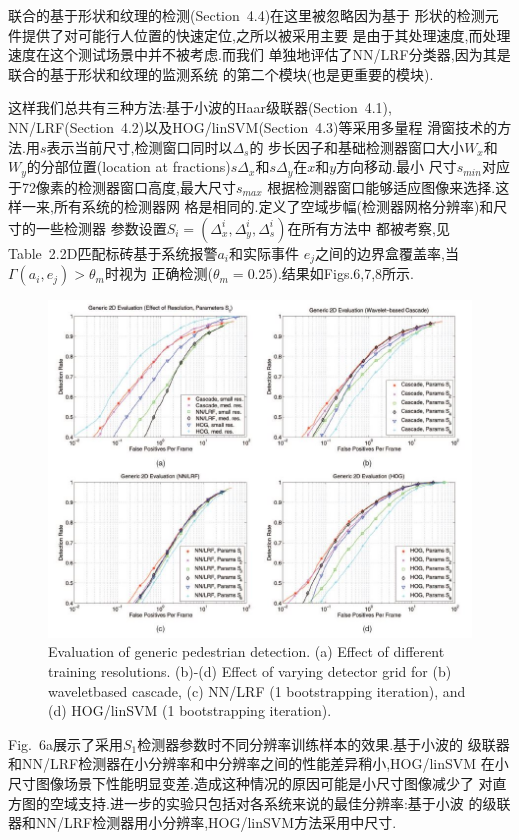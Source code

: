 \documentclass[10pt,letterpaper,journal,compsoc]{IEEEtran}
\begin{document}
联合的基于形状和纹理的检测(Section~4.4)在这里被忽略因为基于
形状的检测元件提供了对可能行人位置的快速定位,之所以被采用主要
是由于其处理速度,而处理速度在这个测试场景中并不被考虑.而我们
单独地评估了NN/LRF分类器,因为其是联合的基于形状和纹理的监测系统
的第二个模块(也是更重要的模块).

这样我们总共有三种方法:基于小波的Haar级联器(Section~4.1),
NN/LRF(Section~4.2)以及HOG/linSVM(Section~4.3)等采用多量程
滑窗技术的方法.用$s$表示当前尺寸,检测窗口同时以$\Delta_s$的
步长因子和基础检测器窗口大小$W_x$和$W_y$的分部位置(location at
fractions)$s\Delta_x$和$s\Delta_y$在$x$和$y$方向移动.最小
尺寸$s_{min}$对应于72像素的检测器窗口高度,最大尺寸$s_{max}$
根据检测器窗口能够适应图像来选择.这样一来,所有系统的检测器网
格是相同的.定义了空域步幅(检测器网格分辨率)和尺寸的一些检测器
参数设置$S_i=(\Delta^i_x,\Delta^i_y,\Delta^i_s)$在所有方法中
都被考察,见Table~2.2D匹配标砖基于系统报警$a_i$和实际事件
$e_j$之间的边界盒覆盖率,当$\Gamma(a_i,e_j)>\theta_m$时视为
正确检测($\theta_m=0.25$).结果如Figs.6,7,8所示.
\begin{figure}[!t]
\centering
\includegraphics[width=7in]{fig6.JPG}
\caption{Evaluation of generic pedestrian detection. (a) Effect of different training resolutions. (b)-(d) Effect of varying detector grid for (b) waveletbased
cascade, (c) NN/LRF (1 bootstrapping iteration), and (d) HOG/linSVM (1 bootstrapping iteration).}
\end{figure}
Fig.~6a展示了采用$S_1$检测器参数时不同分辨率训练样本的效果.基于小波的
级联器和NN/LRF检测器在小分辨率和中分辨率之间的性能差异稍小,HOG/linSVM
在小尺寸图像场景下性能明显变差.造成这种情况的原因可能是小尺寸图像减少了
对直方图的空域支持.进一步的实验只包括对各系统来说的最佳分辨率:基于小波
的级联器和NN/LRF检测器用小分辨率,HOG/linSVM方法采用中尺寸.
\end{document}
